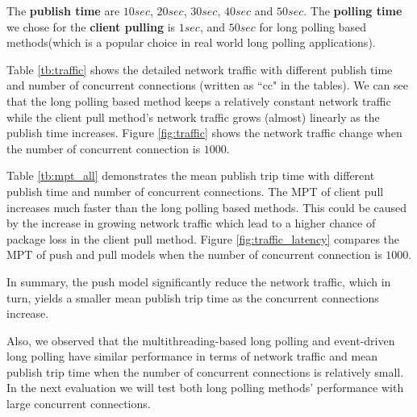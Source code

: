 The {\bf publish time} are $10 sec$, $20 sec$, $30 sec$, $40 sec$ and 
$50 sec$. The {\bf polling time} we chose for the {\bf client pulling}
is $1 sec$, and $50 sec$ for long polling based methods(which is a 
popular choice in real world long polling applications).

Table \ref{tb:traffic} shows the detailed network traffic with different 
publish time and number of concurrent connections (written as ``cc" 
in the tables).  We can see that the long polling based method keeps 
a relatively constant network traffic while the client pull method's 
network traffic grows (almost) linearly as the publish time increases.
Figure \ref{fig:traffic} shows the network traffic change when the number 
of concurrent connection is $1000$.

Table \ref{tb:mpt_all} demonstrates the mean publish trip time with 
different publish time and number of concurrent connections. The MPT of
client pull increases much faster than the long polling based methods.
This could be caused by the increase in growing network traffic which lead to a 
higher chance of package loss in the client pull method. 
Figure \ref{fig:traffic_latency} compares the MPT of push and pull models when 
the number of concurrent connection is $1000$.

In summary, the push model significantly reduce the network traffic, which in
turn, yields a smaller mean publish trip time as the concurrent connections 
increase. 

Also, we observed that the multithreading-based long polling and event-driven long 
polling have similar performance in terms of network traffic and mean publish
trip time when the number of concurrent connections is relatively small. In the 
next evaluation we will test both long polling methods' performance with large 
concurrent connections.

